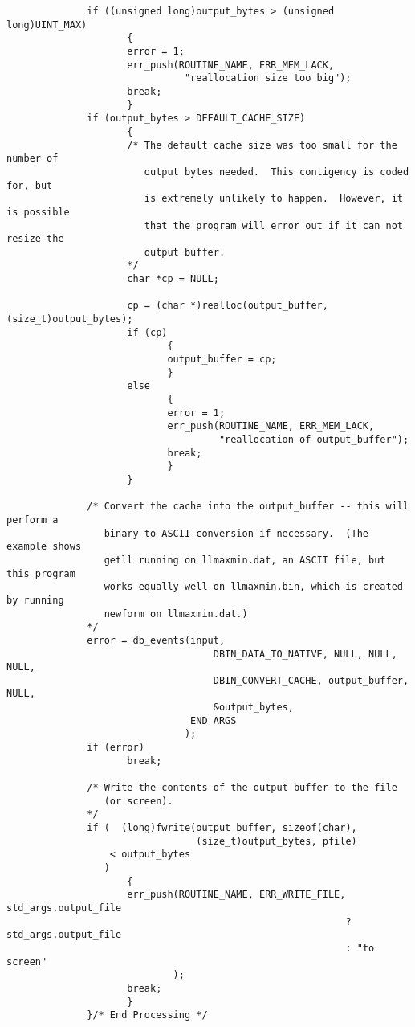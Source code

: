 \begin{verbatim}
              if ((unsigned long)output_bytes > (unsigned long)UINT_MAX)
                     {
                     error = 1;
                     err_push(ROUTINE_NAME, ERR_MEM_LACK, 
                               "reallocation size too big");
                     break;
                     }
              if (output_bytes > DEFAULT_CACHE_SIZE)
                     {
                     /* The default cache size was too small for the number of 
                        output bytes needed.  This contigency is coded for, but 
                        is extremely unlikely to happen.  However, it is possible 
                        that the program will error out if it can not resize the 
                        output buffer.
                     */
                     char *cp = NULL;
                     
                     cp = (char *)realloc(output_buffer, (size_t)output_bytes);
                     if (cp)
                            {
                            output_buffer = cp;
                            }
                     else
                            {
                            error = 1;
                            err_push(ROUTINE_NAME, ERR_MEM_LACK,
                                     "reallocation of output_buffer");
                            break;
                            }
                     }
         
              /* Convert the cache into the output_buffer -- this will perform a 
                 binary to ASCII conversion if necessary.  (The example shows 
                 getll running on llmaxmin.dat, an ASCII file, but this program 
                 works equally well on llmaxmin.bin, which is created by running 
                 newform on llmaxmin.dat.)
              */
              error = db_events(input,
                                    DBIN_DATA_TO_NATIVE, NULL, NULL, NULL,
                                    DBIN_CONVERT_CACHE, output_buffer, NULL, 
                                    &output_bytes, 
                                END_ARGS
                               );
              if (error)
                     break;

              /* Write the contents of the output buffer to the file
                 (or screen).
              */
              if (  (long)fwrite(output_buffer, sizeof(char), 
                                 (size_t)output_bytes, pfile)
                  < output_bytes
                 )
                     {
                     err_push(ROUTINE_NAME, ERR_WRITE_FILE,  std_args.output_file
                                                           ? std_args.output_file
                                                           : "to screen"
                             );
                     break;
                     }
              }/* End Processing */


\end{verbatim}
